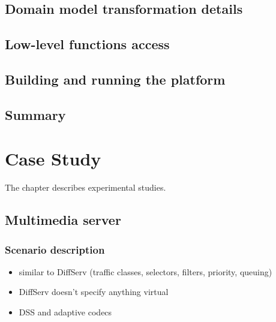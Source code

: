 \documentclass[11pt]{book}
\begin{document}
        


    \section{Domain model transformation details}
        


    \section{Low-level functions access}


    \section{Building and running the platform}


    \section*{Summary}


  \chapter{Case Study}

    The chapter describes experimental studies.

    \section{Multimedia server}

      \subsection{Scenario description}




        \begin{itemize}
          \item similar to DiffServ (traffic classes, selectors, filters, priority, queuing)
          \item DiffServ doesn't specify anything virtual
          \item DSS and adaptive codecs
        \end{itemize}
\end{document}
